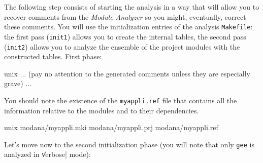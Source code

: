 The following step consists of starting the analysis in a way that will allow you to recover comments from the {\em Module Analyzer} so you might, eventually, correct these comments.  You will use the initialization entries of the analysis {\tt Makefile}:
the first pass ({\tt init1}) allows you to create the internal tables, the second pass ({\tt init2}) allows you to analyze the ensemble of the project modules with the constructed tables.  First phase:

\begin{Longcode*}
unix%
 ...
 (pay no attention to the generated comments unless they are especially grave)
 ...
\end{Longcode*}

You should note the existence of the {\tt myappli.ref} file that contains all the information relative to the modules and to their dependencies. 
\begin{Longcode*}
unix%
modana/myappli.mki
modana/myappli.prj
modana/myappli.ref
\end{Longcode*}

Let's move now to the second initialization phase (you will note that only {\tt gee} is analyzed in \|verbose| mode):

